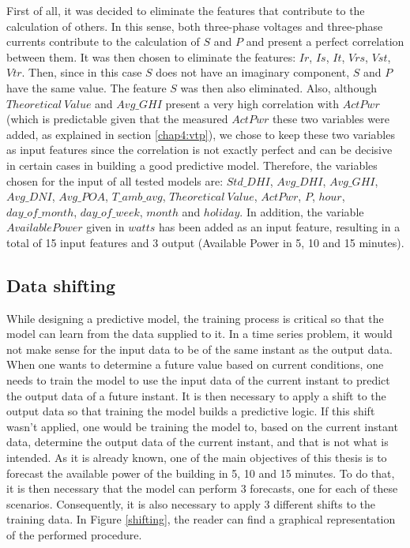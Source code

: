 First of all, it was decided to eliminate the features that contribute to the calculation of others. In this sense, both three-phase voltages and three-phase currents contribute to the calculation of $S$ and $P$ and present a perfect correlation between them. It was then chosen to eliminate the features: $Ir$, $Is$, $It$, $Vrs$, $Vst$, $Vtr$. Then, since in this case $S$ does not have an imaginary component, $S$ and $P$ have the same value. The feature $S$ was then also eliminated. Also, although $Theoretical\ Value$ and $Avg\_GHI$ present a very high correlation with $ActPwr$ (which is predictable given that the measured $ActPwr$ these two variables were added, as explained in section \ref{chap4:vtp}), we chose to keep these two variables as input features since the correlation is not exactly perfect and can be decisive in certain cases in building a good predictive model. Therefore, the variables chosen for the input of all tested models are: $Std\_DHI$, $Avg\_DHI$, $Avg\_GHI$, $Avg\_DNI$, $Avg\_POA$, $T\_amb\_avg$, $Theoretical\ Value$, $ActPwr$, $P$, $hour$, $day\_of\_month$, $day\_of\_week$, $month$ and $holiday$. In addition, the variable $Available Power$ given in $watts$ has been added as an input feature, resulting in a total of 15 input features and 3 output (Available Power in 5, 10 and 15 minutes).


\subsection{Data shifting}

While designing a predictive model, the training process is critical so that the model can learn from the data supplied to it. In a time series problem, it would not make sense for the input data to be of the same instant as the output data. When one wants to determine a future value based on current conditions, one needs to train the model to use the input data of the current instant to predict the output data of a future instant. It is then necessary to apply a shift to the output data so that training the model builds a predictive logic. If this shift wasn't applied, one would be training the model to, based on the current instant data, determine the output data of the current instant, and that is not what is intended. As it is already known, one of the main objectives of this thesis is to forecast the available power of the building in 5, 10 and 15 minutes. To do that, it is then necessary that the model can perform 3 forecasts, one for each of these scenarios. Consequently, it is also necessary to apply 3 different shifts to the training data. In Figure \ref{shifting}, the reader can find a graphical representation of the performed procedure.


